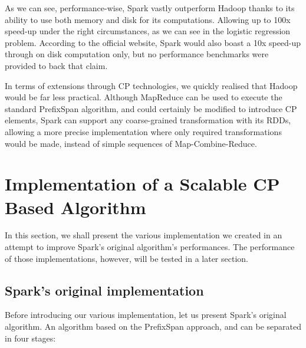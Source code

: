 \documentclass{eplmastersthesis}
\begin{document}
As we can see, performance-wise, Spark vastly outperform Hadoop thanks to its ability to use both memory and disk for its computations. Allowing up to 100x speed-up under the right circumstances, as we can see in the logistic regression problem. According to the official website, Spark would also boast a 10x speed-up through on disk computation only, but no performance benchmarks were provided to back that claim. \newline

In terms of extensions through CP technologies, we quickly realised that Hadoop would be far less practical. Although MapReduce can be used to execute the standard PrefixSpan algorithm, and could certainly be modified to introduce CP elements, Spark can support any coarse-grained transformation with its RDDs, allowing a more precise implementation where only required transformations would be made, instead of simple sequences of Map-Combine-Reduce. \newline

\newpage
\section{Implementation of a Scalable CP Based Algorithm}

In this section, we shall present the various implementation we created in an attempt to improve Spark's original algorithm's performances. The performance of those implementations, however, will be tested in a later section.

\subsection{Spark's original implementation}

Before introducing our various implementation, let us present Spark's original algorithm. An algorithm based on the PrefixSpan approach, and can be separated in four stages:
\end{document}
